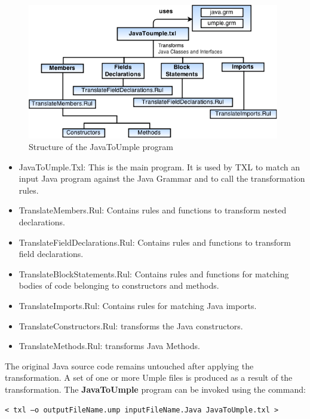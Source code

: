 \begin{figure}[h]
\centering
\includegraphics[width=0.98\textwidth]{Figures/TXL_STRUCTURE.png} 
\caption{Structure of the JavaToUmple program}
\label{fig:txlStructure}
\end{figure}

\begin{itemize}
\item JavaToUmple.Txl: This is the main program. It is used by TXL to match an input Java program against the Java Grammar and to call the transformation rules.
\item TranslateMembers.Rul: Contains rules and functions to transform nested declarations.
\item TranslateFieldDeclarations.Rul: Contains rules and functions to transform field declarations.
\item  TranslateBlockStatements.Rul: Contains rules and functions for matching bodies of code belonging to constructors and methods.
\item TranslateImports.Rul: Contains rules for matching Java imports.
\item TranslateConstructors.Rul: transforms the Java constructors.
\item TranslateMethods.Rul: transforms Java Methods.
\end{itemize}

The original Java source code remains untouched after applying the transformation. A set of one or more Umple files is produced as a result of the transformation. The \textbf{JavaToUmple} program can be invoked using the command:

\vspace{\baselineskip}
\begin{lstlisting}[style=umplePlain]
< txl –o outputFileName.ump inputFileName.Java JavaToUmple.txl >
\end{lstlisting}

